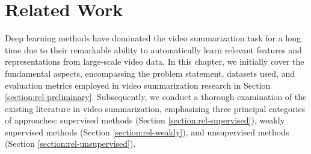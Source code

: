 \chapter{Related Work}
\label{chapter:related}

\begin{ChapAbstract}
  Deep learning methods have dominated the video summarization task for a long time due to their remarkable ability to automatically learn relevant features and representations from large-scale video data. In this chapter, we initially cover the fundamental aspects, encompassing the problem statement, datasets used, and evaluation metrics employed in video summarization research in Section \ref{section:rel-preliminary}. Subsequently, we conduct a thorough examination of the existing literature in video summarization, emphasizing three principal categories of approaches: supervised methods (Section \ref{section:rel-supervised}), weakly supervised methods (Section \ref{section:rel-weakly}), and unsupervised methods (Section \ref{section:rel-unsupervised}).
\end{ChapAbstract}








